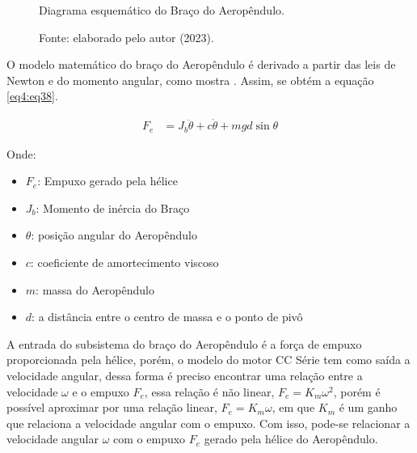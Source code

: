 \begin{figure}[!h]
	\centering
	\caption{Diagrama esquemático do Braço do Aeropêndulo.}
	\caption*{Fonte: elaborado pelo autor (2023).}
        \label{fig4:image_04}
\end{figure}


O modelo matemático do braço do Aeropêndulo é derivado a partir das leis de Newton e do momento angular, como mostra \cite{amin}. Assim, se obtém a equação \ref{eq4:eq38}.

\begin{align}
    F_e &= J_b\ddot{\theta} + c\dot{\theta} +mgd\sin{\theta}  \label{eq4:eq38}
\end{align}

\noindent Onde:

\begin{itemize}
        \setlength{\itemsep}{-2pt}
	\item  $F_e$: Empuxo gerado pela hélice
        \item  $J_b$: Momento de inércia do Braço
        \item  $\theta$: posição angular do Aeropêndulo
        \item  $c$: coeficiente de amortecimento viscoso
        \item  $m$: massa do Aeropêndulo
        \item  $d$: a distância entre o centro de massa e o ponto de pivô
\end{itemize}

A entrada do subsistema do braço do Aeropêndulo é a força de empuxo proporcionada pela hélice, porém, o modelo do motor CC Série tem como saída a velocidade angular, dessa forma é preciso encontrar uma relação entre a velocidade $\omega$ e o empuxo $F_e$, essa relação é não linear, $F_e = K_m\omega^2$, porém é possível aproximar por uma relação linear,  $F_e = K_m\omega$, em que $K_m$ é um ganho que relaciona a velocidade angular com o empuxo. Com isso, pode-se relacionar a velocidade angular $\omega$  com o empuxo $F_e$ gerado pela hélice do Aeropêndulo.

